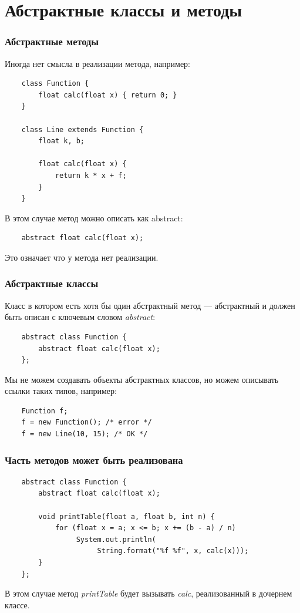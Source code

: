 \section{Абстрактные классы и методы}

\begin{frame}[fragile]
	\frametitle{Абстрактные методы}

	Иногда нет смысла в реализации метода, например:
	\begin{verbatim}
	class Function {
	    float calc(float x) { return 0; }
	}

	class Line extends Function {
	    float k, b;

	    float calc(float x) {
	        return k * x + f;
	    }
	}
	\end{verbatim}
	В этом случае метод можно описать как abstract:
	\begin{verbatim}
	abstract float calc(float x);
	\end{verbatim}
	Это означает что у метода нет реализации.

\end{frame}


\begin{frame}[fragile]
	\frametitle{Абстрактные классы}
	\begin{large}
	Класс в котором есть хотя бы один абстрактный метод --- абстрактный и должен быть описан с ключевым словом \emph{abstract}:

	\begin{verbatim}
	abstract class Function {
	    abstract float calc(float x);
	};
	\end{verbatim}

	Мы не можем создавать объекты абстрактных классов, но можем описывать ссылки таких типов, например:
	\begin{verbatim}
	Function f;
	f = new Function(); /* error */
	f = new Line(10, 15); /* OK */
	\end{verbatim}
	\end{large}
\end{frame}

\begin{frame}[fragile]
	\frametitle{Часть методов может быть реализована}

	\begin{verbatim}
	abstract class Function {
	    abstract float calc(float x);

	    void printTable(float a, float b, int n) {
	        for (float x = a; x <= b; x += (b - a) / n)
	             System.out.println(
	                  String.format("%f %f", x, calc(x)));
	    }
	};
	\end{verbatim}

	В этом случае метод \emph{printTable} будет вызывать \emph{calc}, реализованный в дочернем классе.
\end{frame}

